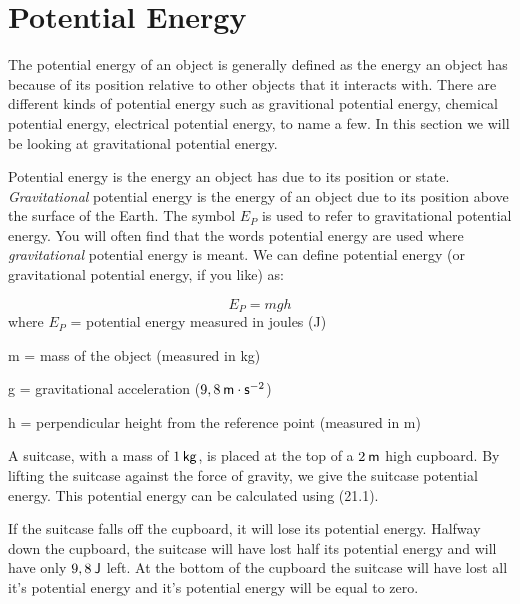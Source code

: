             \section{Potential Energy}
            \nopagebreak
      \label{m38784*id66142}The potential energy of an object is generally defined as the energy an object has because of its position relative to other objects that it interacts with. There are different kinds of potential energy such as gravitional potential energy, chemical potential energy, electrical potential energy, to name a few. In this section we will be looking at gravitational potential energy.\par 
{} { Potential energy is the energy an object has due to its position or state. } 
      \label{m38784*id66167}\textsl{Gravitational} potential energy is the energy of an object due to its position above the surface of the Earth. The symbol ${E}_{P}$ is used to refer to gravitational potential energy. You will often find that the words potential energy are used where \textsl{gravitational} potential energy is meant. We can define potential energy (or gravitational potential energy, if you like) as:\par 
      \label{m38784*uid45}\nopagebreak\noindent{}
    \begin{equation}
    {E}_{P}=mgh
      \end{equation}
      \label{m38784*id66223}where
${E}_{P}$ = potential energy measured in joules (J)\par 
      \label{m38784*id66229}m = mass of the object (measured in kg)\par 
      \label{m38784*id66234}g = gravitational acceleration ($9,8\phantom{\rule{2pt}{0ex}}\mathsf{m}\ensuremath{\cdot}\mathsf{s}{}^{-2}$)\par 
      \label{m38784*id66266}h = perpendicular height from the reference point (measured in m)\par 
      \label{m38784*eip-306}
      \label{m38784*id66272}A suitcase, with a mass of $1\phantom{\rule{2pt}{0ex}}\mathsf{kg}$, is placed at the top of a $2\phantom{\rule{2pt}{0ex}}\mathsf{m}$ high cupboard. By lifting the suitcase against the force of gravity, we give the suitcase potential energy. This potential energy can be calculated using (21.1).\par 
      \label{m38784*id66283}If the suitcase falls off the cupboard, it will lose its potential energy. Halfway down the cupboard, the suitcase will have lost half its potential energy and will have only $9,8\phantom{\rule{2pt}{0ex}}\mathsf{J}$ left. At the bottom of the cupboard the suitcase will have lost all it's potential energy and it's potential energy will be equal to zero.\par 
